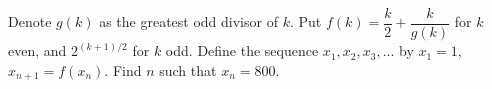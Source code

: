 Denote $g(k)$ as the greatest odd divisor of $k$. Put $f(k) = \dfrac{k}{2} + \dfrac{k}{g(k)}$ for $k$ even, and $2^{(k+1)/2}$ for $k$ odd. Define the sequence $x_1, x_2, x_3, ...$ by $x_1 = 1$, $x_{n+1} = f(x_n)$. Find $n$ such that $x_n = 800$.